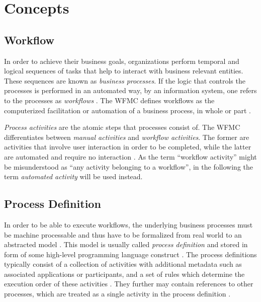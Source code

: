 
\section{Concepts} %
\label{sec:concepts}

  \subsection{Workflow} %
  \label{sub:workflow}
    In order to achieve their business goals, organizations perform temporal and logical sequences of tasks that help to interact with business relevant entities. These sequences are known as \emph{business processes}. If the logic that controls the processes is performed in an automated way, \eg by an information system, one refers to the processes as \emph{workflows} \cite{Becker1999Identifying,Hollingsworth1995Wfmc}. The \ac{WFMC} defines workflows as the computerized facilitation or automation of a business process, in whole or part \cite{Hollingsworth1995Wfmc}.

    \emph{Process activities} are the atomic steps that processes consist of. The \ac{WFMC} differentiates between \emph{manual activities} and \emph{workflow activities}. The former are activities that involve user interaction in order to be completed, while the latter are automated and require no interaction \cite{Hollingsworth1995Wfmc}. As the term ``workflow activity'' might be misunderstood as ``any activity belonging to a workflow'', in the following the term \emph{automated activity} will be used instead.


  \subsection{Process Definition} %
  \label{sub:process_definition}
      In order to be able to execute workflows, the underlying business processes must be machine processable and thus have to be formalized from real world to an abstracted model \cite{Hollingsworth1995Wfmc}. This model is usually called \emph{process definition} and stored in form of some high-level programming language construct \cite{Hollingsworth1995Wfmc,Wutke2008Model}.
      The process definitions typically consist of a collection of activities with additional metadata such as associated applications or participants, and a set of rules which determine the execution order of these activities \cite{Hollingsworth1995Wfmc}. They further may contain references to other processes, which are treated as a single activity in the process definition \cite{Hollingsworth1995Wfmc,Casati1999Specification}.

